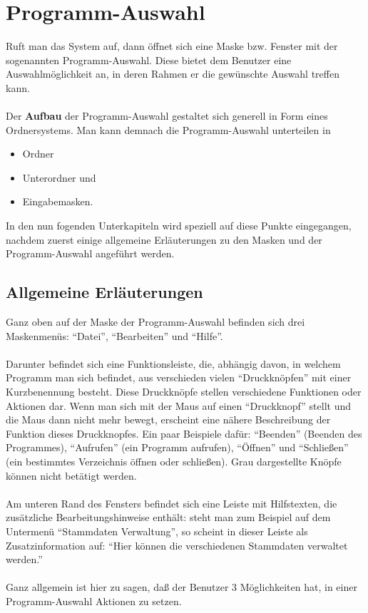 \cleardoublepage

\section{Programm-Auswahl} 

Ruft man das System auf, dann \"{o}ffnet
sich eine Maske bzw. Fenster mit der sogenannten Programm-Auswahl.
Diese bietet dem Benutzer eine Auswahlm\"{o}glichkeit an, in deren Rahmen er
die gew\"{u}nschte Auswahl treffen kann. \\
\\
Der {\bf Aufbau} der Programm-Auswahl gestaltet sich generell in Form eines
Ordnersystems. Man kann demnach die Programm-Auswahl unterteilen in 

\begin{itemize}
\item Ordner
\item Unterordner und
\item Eingabemasken.
\end{itemize}

In  den nun fogenden Unterkapiteln  wird speziell auf diese Punkte
eingegangen, nachdem zuerst einige allgemeine Erl\"{a}uterungen zu den Masken
und der Programm-Auswahl angef\"{u}hrt werden.

\subsection{Allgemeine Erl\"{a}uterungen}

Ganz oben auf der Maske der Programm-Auswahl befinden sich drei
Maskenmen\"{u}s:
``Datei'', ``Bearbeiten'' und ``Hilfe''.\\
\\
Darunter befindet sich eine Funktionsleiste, die, abh\"{a}ngig davon, in
welchem Programm man sich befindet, aus verschieden vielen ``Druckkn\"{o}pfen'' mit
einer Kurzbenennung besteht. Diese Druckkn\"{o}pfe stellen verschiedene
Funktionen oder Aktionen dar. Wenn man sich mit der Maus auf einen
``Druckknopf'' stellt und die Maus dann nicht mehr bewegt, erscheint eine
n\"{a}here Beschreibung der Funktion dieses Druckknopfes. Ein paar Beispiele
daf\"{u}r: ``Beenden'' (Beenden des Programmes), ``Aufrufen'' (ein Programm
aufrufen), ``\"{O}ffnen'' und ``Schlie{\ss}en'' (ein bestimmtes Verzeichnis
\"{o}ffnen oder schlie{\ss}en). Grau dargestellte Kn\"{o}pfe k\"{o}nnen nicht
bet\"{a}tigt werden.\\
\\
Am unteren Rand des Fensters befindet sich eine Leiste mit Hilfstexten, die
zus\"{a}tzliche Bearbeitungshinweise enth\"{a}lt: steht man zum
Beispiel auf dem Untermen\"{u} ``Stammdaten Verwaltung'', so scheint in dieser
Leiste als Zusatzinformation auf: ``Hier k\"{o}nnen die verschiedenen
Stammdaten verwaltet werden.''\\
\\
Ganz allgemein ist hier zu sagen, da{\ss} der Benutzer 3 M\"{o}glichkeiten hat,
in einer Programm-Auswahl Aktionen zu setzen.


